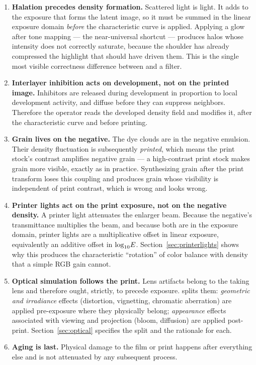 \begin{enumerate}
\item \textbf{Halation precedes density formation.} Scattered light is light.
It adds to the exposure that forms the latent image, so it must be summed in
the linear exposure domain \emph{before} the characteristic curve is applied.
Applying a glow after tone mapping --- the near-universal shortcut --- produces
halos whose intensity does not correctly saturate, because the shoulder has
already compressed the highlight that should have driven them. This is the
single most visible correctness difference between \EM{} and a filter.
\item \textbf{Interlayer inhibition acts on development, not on the printed
image.} Inhibitors are released during development in proportion to local
development activity, and diffuse before they can suppress neighbors.
Therefore the operator reads the developed density field and modifies it, after
the characteristic curve and before printing.
\item \textbf{Grain lives on the negative.} The dye clouds are in the negative
emulsion. Their density fluctuation is subsequently \emph{printed}, which means
the print stock's contrast amplifies negative grain --- a high-contrast print
stock makes grain more visible, exactly as in practice. Synthesizing grain
after the print transform loses this coupling and produces grain whose
visibility is independent of print contrast, which is wrong and looks wrong.
\item \textbf{Printer lights act on the print exposure, not on the negative
density.} A printer light attenuates the enlarger beam. Because the negative's
transmittance multiplies the beam, and because both are in the exposure domain,
printer lights are a multiplicative offset in linear exposure, equivalently an
additive offset in $\log_{10}\!E$. Section~\ref{sec:printerlights} shows why this
produces the characteristic ``rotation'' of color balance with density that a
simple RGB gain cannot.
\item \textbf{Optical simulation follows the print.} Lens artifacts belong to
the taking lens and therefore ought, strictly, to precede exposure. \EM{}
splits them: \emph{geometric and irradiance} effects (distortion, vignetting,
chromatic aberration) are applied pre-exposure where they physically belong;
\emph{appearance} effects associated with viewing and projection (bloom,
diffusion) are applied post-print. Section~\ref{sec:optical} specifies the
split and the rationale for each.
\item \textbf{Aging is last.} Physical damage to the film or print happens
after everything else and is not attenuated by any subsequent process.
\end{enumerate}

